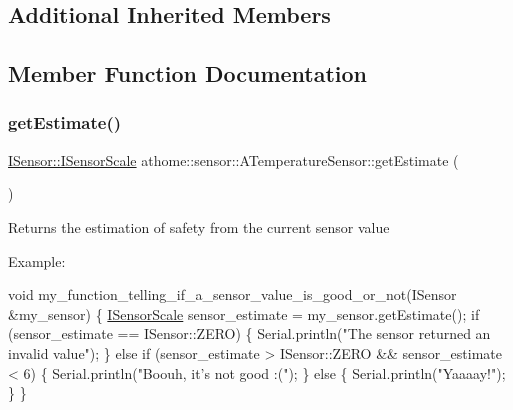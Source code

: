 \subsection*{Additional Inherited Members}


\subsection{Member Function Documentation}
\mbox{\label{classathome_1_1sensor_1_1_a_temperature_sensor_a3997ff080f6a9e444c52a63f1b40d73c}} 
\subsubsection{\texorpdfstring{get\+Estimate()}{getEstimate()}}
{\footnotesize\ttfamily \mbox{\hyperlink{classathome_1_1sensor_1_1_i_sensor_aa70bc27a4c17c86caf96cca776541ddf}{I\+Sensor\+::\+I\+Sensor\+Scale}} athome\+::sensor\+::\+A\+Temperature\+Sensor\+::get\+Estimate (\begin{DoxyParamCaption}{ }\end{DoxyParamCaption})\hspace{0.3cm}{\ttfamily [virtual]}}

Returns the estimation of safety from the current sensor value

Example\+:


\begin{DoxyCode}
\textcolor{keywordtype}{void} my\_function\_telling\_if\_a\_sensor\_value\_is\_good\_or\_not(ISensor &my\_sensor) \{
  \mbox{\hyperlink{classathome_1_1sensor_1_1_i_sensor_aa70bc27a4c17c86caf96cca776541ddf}{ISensorScale}} sensor\_estimate = my\_sensor.getEstimate();
  \textcolor{keywordflow}{if} (sensor\_estimate == ISensor::ZERO) \{
    Serial.println(\textcolor{stringliteral}{"The sensor returned an invalid value"});
  \}
  \textcolor{keywordflow}{else} \textcolor{keywordflow}{if} (sensor\_estimate > ISensor::ZERO && sensor\_estimate < 6) \{
    Serial.println(\textcolor{stringliteral}{"Boouh, it's not good :("});
  \}
  \textcolor{keywordflow}{else} \{
    Serial.println(\textcolor{stringliteral}{"Yaaaay!"});
  \}
\}
\end{DoxyCode}
 

